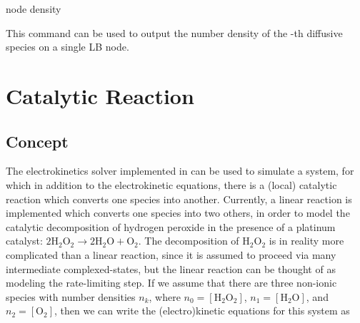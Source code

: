 \begin{essyntax}
  node   
  density
  \begin{features}
  \end{features}
\end{essyntax}
This command can be used to output the number density of the
-th diffusive species on a single LB node.

\section{Catalytic Reaction}

\subsection{Concept}

The electrokinetics solver implemented in \es{} can be used to simulate a
system, for which in addition to the electrokinetic equations, there is a 
(local) catalytic reaction which converts one species into another. Currently,
a linear reaction is implemented which converts one species into two others, in
order to model the catalytic decomposition of hydrogen peroxide in the presence
of a platinum catalyst: $2 \mathrm{H}_{2}\mathrm{O}_{2} \rightarrow 
2 \mathrm{H}_{2}\mathrm{O} + \mathrm{O}_{2}$. The decomposition of 
$\mathrm{H}_{2}\mathrm{O}_{2}$ is in reality more complicated than a linear 
reaction, since it is assumed to proceed via many intermediate complexed-states, 
but the linear reaction can be thought of as modeling the rate-limiting step.
If we assume that there are three non-ionic species with number densities
$n_{k}$, where $n_{0} = [ \mathrm{H}_{2}\mathrm{O}_{2} ]$,
$n_{1} = [ \mathrm{H}_{2}\mathrm{O} ]$, and $n_{2} = [ \mathrm{O}_{2} ]$, 
then we can write the (electro)kinetic equations for this system as

